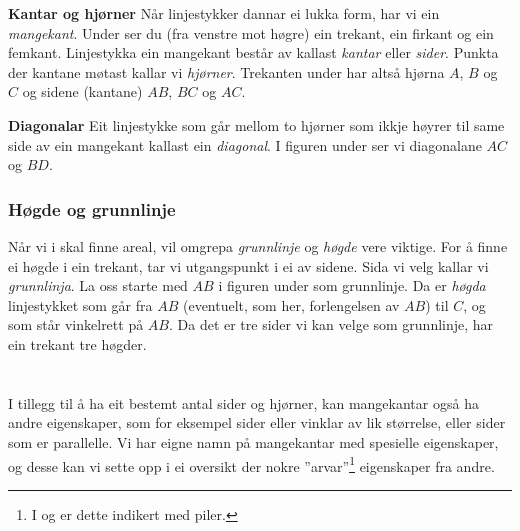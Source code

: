 \begin{comment}
\reg[Samsvarande vinklar]{
	Vinkler med eit høgre eller venstre vinkelbein felles, kallast \textit{samsvarende vinkler}. I figuren under er dei markerte vinklane samsvarande fordi alle tre har den raude linja som venstre vinkelbein.
\fig{vink4}
	Vinklar med parvis parallelle høgre og venstre vinkelbein er like store.
\fig{vink4b}
}
\end{comment}
\newpage
\textbf{Kantar og hjørner} \os
Når linjestykker dannar ei lukka form, har vi ein \textit{mangekant}. Under ser du (fra venstre mot høgre) ein trekant, ein firkant og ein femkant.
Linjestykka ein mangekant består av kallast \textit{kantar} eller \textit{sider}. Punkta der kantane møtast kallar vi \textit{hjørner}. Trekanten under har altså hjørna $ A $, $ B $ og $ C $ og sidene (kantane) $ AB $, $ BC $ og $ AC $.
 \vsk

\textbf{Diagonalar} \os
Eit linjestykke som går mellom to hjørner som ikkje høyrer til same side av ein mangekant kallast ein \textit{diagonal}. I figuren under ser vi diagonalane $ AC $ og $ BD $.
\newpage
\subsubsection{Høgde og grunnlinje \label{grunnlinje}}
Når vi i  skal finne areal, vil omgrepa \textit{grunnlinje} og \textit{høgde} vere viktige. For å finne ei høgde i ein trekant, tar vi utgangspunkt i ei av sidene. Sida vi velg kallar vi \textit{grunnlinja}. La oss starte med $ AB $ i figuren under som grunnlinje. Da er \textit{høgda} linjestykket som går fra $ AB $ (eventuelt, som her, forlengelsen av $ AB $) til $ C $, og som står vinkelrett på $ AB $.
Da det er tre sider vi kan velge som grunnlinje, har ein trekant tre høgder.
\section{\eignsk}
I tillegg til å ha eit bestemt antal sider og hjørner, kan mangekantar også ha andre eigenskaper, som for eksempel sider eller vinklar av lik størrelse, eller sider som er parallelle. Vi har eigne namn på mangekantar med spesielle eigenskaper, og desse kan vi sette opp i ei oversikt der nokre ''arvar''\footnote{I  og  er dette indikert med piler.} eigenskaper fra andre.\regv


